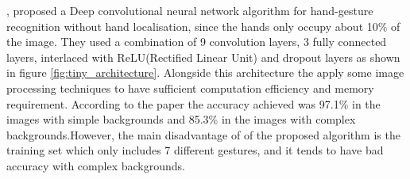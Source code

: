 \documentclass[12pt]{report}
\begin{document}
                \cite{Bao2017}, proposed a Deep convolutional neural network algorithm for hand-gesture 
                recognition without hand localisation, since the hands only occupy about 10\% of 
                the image. They used a combination of 9 convolution layers, 3 fully connected layers, 
                interlaced with ReLU(Rectified Linear Unit) and dropout layers as shown in 
                figure \ref{fig:tiny_architecture}. Alongside this architecture the apply some image 
                processing techniques to have sufficient computation efficiency and memory requirement.
                According to the paper the accuracy achieved was 97.1\% in the images with simple backgrounds
                and 85.3\% in the images with complex backgrounds.However, the main disadvantage of of 
                the proposed algorithm is the training set which only includes 7 different gestures,
                and it tends to have bad accuracy with complex backgrounds.
                \bigbreak
\end{document}
